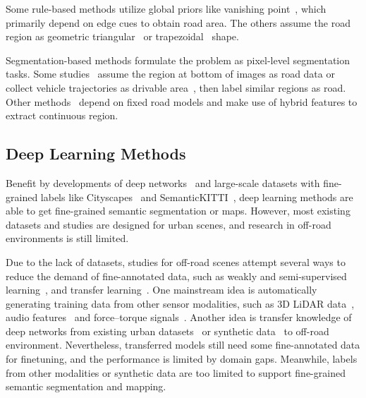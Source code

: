 \documentclass[letterpaper, 10 pt, conference]{ieeeconf}  %
\begin{document}
Some rule-based methods utilize global priors like vanishing point~\cite{kong2009vanishing}\cite{shi2015fast}, which primarily depend on edge cues to obtain road area. The others assume the road region as geometric triangular~\cite{zhou2010self} or trapezoidal~\cite{jeong2002vision} shape.

Segmentation-based methods formulate the problem as pixel-level segmentation tasks. Some studies~\cite{lu2014hierarchical}
assume the region at bottom of images as road data or collect vehicle trajectories as drivable area~\cite{mei2017scene}, then label similar regions as road.
Other methods~\cite{alon2006off}\cite{wang2009unstructured} depend on fixed road models and make use of hybrid features to extract continuous region.

\subsection{Deep Learning Methods}
Benefit by developments of deep networks~\cite{long2015fully} and large-scale datasets with fine-grained labels like Cityscapes~\cite{cordts2016cityscapes} and SemanticKITTI~\cite{behley2019semantickitti}, deep learning methods are able to get fine-grained semantic segmentation or maps. However, most existing datasets and studies are designed for urban scenes, and research in off-road environments is still limited.

Due to the lack of datasets, studies for off-road scenes attempt several ways to reduce the demand of fine-annotated data, such as weakly and semi-supervised learning~\cite{suger2015traversability}\cite{gao2019off}, and transfer learning~\cite{holder2016road}\cite{sharma2019semantic}. 
One mainstream idea is automatically generating training data from other sensor modalities, such as 3D LiDAR data~\cite{tang2017one}\cite{gao2019off}, audio features~\cite{zurn2020self} and force–torque signals~\cite{wellhausen2019should}.
Another idea is transfer knowledge of deep networks from existing urban datasets~\cite{holder2016road} or synthetic data~\cite{sharma2019semantic} to off-road environment.
Nevertheless, transferred models still need some fine-annotated data for finetuning, and the performance is limited by domain gaps. Meanwhile, labels from other modalities or synthetic data are too limited to support fine-grained semantic segmentation and mapping.
\end{document}
